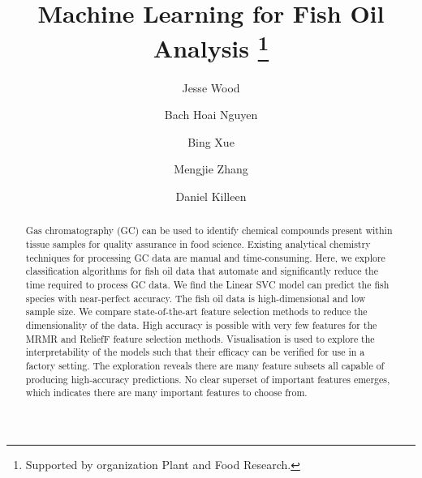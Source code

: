 \documentclass[runningheads]{llncs}
\begin{document}
%
\title{Machine Learning for Fish Oil Analysis \thanks{Supported by organization Plant and Food Research.}}
%
%
\author{Jesse Wood \and
Bach Hoai Nguyen \and
Bing Xue \and 
Mengjie Zhang \and 
Daniel Killeen
} 
%
%

%
\maketitle              %
%
\begin{abstract}

Gas chromatography (GC) can be used to identify chemical compounds present within tissue samples for quality assurance in food science.
Existing analytical chemistry techniques for processing GC data are manual and time-consuming.
Here, we explore classification algorithms for fish oil data that automate and significantly reduce the time required to process GC data.
We find the Linear SVC model can predict the fish species with near-perfect accuracy.
The fish oil data is high-dimensional and low sample size.
We compare state-of-the-art feature selection methods to reduce the dimensionality of the data.
High accuracy is possible with very few features for the MRMR and ReliefF feature selection methods.
Visualisation is used to explore the interpretability of the models such that their efficacy can be verified for use in a factory setting.
The exploration reveals there are many feature subsets all capable of producing high-accuracy predictions.
No clear superset of important features emerges, which indicates there are many important features to choose from.

\end{abstract}
%
%
%
\end{document}
